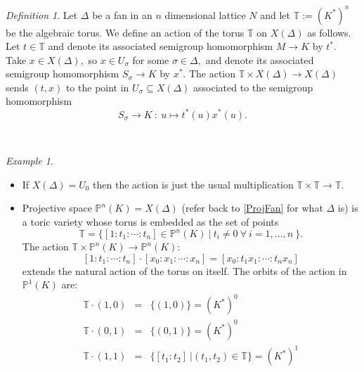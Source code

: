 \documentclass[BSc]{usydthesis}
\numberwithin{equation}{chapter}
\theoremstyle{remark}
\newtheorem{Definition}[equation]{Definition}
\newtheorem{Example}[equation]{Example}
\newcommand{\T}{\mathbb{T}}
\newcommand{\Proj}{\mathbb{P}}
\begin{document}
\begin{Definition}
 Let $\Delta$ be a fan in an $n$ dimensional lattice $N$ and let $\T:= (K^*)^n$ be the algebraic torus. We define an action of the torus $\T$ on $X(\Delta)$ as follows. Let $t\in \T$ and denote its associated semigroup homomorphism $M\to K$ by $t^*.$ Take $x\in X(\Delta),$ so $x\in U_{\sigma}$ for some $\sigma \in \Delta,$ and denote its associated semigroup homomorphism $S_{\sigma}\to K$ by $x^*.$ The action $\T \times X(\Delta) \to X(\Delta)$ sends $(t,x)$ to the point in $U_{\sigma} \subseteq X(\Delta)$ associated to the semigroup homomorphism $$S_{\sigma}\to K \ : \ u \mapsto t^*(u)x^*(u).$$ 
\end{Definition}
~
\begin{Example}
~
\begin{itemize}
  \item If $X(\Delta) = U_0$ then the action is just the usual multiplication $\T \times \T \to \T.$
  \item Projective space $\Proj^n(K)= X(\Delta)$ (refer back to \ref{ProjFan} for what $\Delta$ is) is a toric variety whose torus is embedded as the set of points $$\T = \{ [1:t_1:\cdots: t_n] \in \Proj^n(K) \ | \ t_i\neq 0 \ \forall \ i=1,\ldots, n \ \}.$$ The action $\T \times \Proj^n(K) \to \Proj^n(K):$ $$ [1:t_1:\cdots: t_n]\cdot [x_0:x_1:\cdots: x_n] = [x_0 : t_1x_1: \cdots : t_n x_n] $$ extends the natural action of the torus on itself. The orbits of the action in $\Proj^1(K)$ are: 
  \begin{eqnarray}
 \T\cdot (1,0) &=& \{ (1,0) \} = (K^*)^0      \nonumber \\
  \T\cdot (0,1) &=& \{ (0,1) \}  = (K^*)^0 \nonumber \\
  \T \cdot (1,1) &=&  \{ [t_1:t_2] \ | (t_1,t_2)\in \T \} = (K^*)^1 \nonumber 
\end{eqnarray}
  

\end{itemize}
\end{Example}
\end{document}
